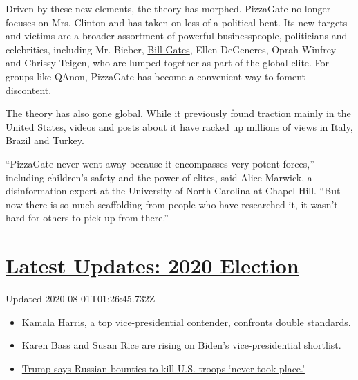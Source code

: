 Driven by these new elements, the theory has morphed. PizzaGate no
longer focuses on Mrs. Clinton and has taken on less of a political
bent. Its new targets and victims are a broader assortment of powerful
businesspeople, politicians and celebrities, including Mr. Bieber,
\href{https://www.nytimes3xbfgragh.onion/2020/04/17/technology/bill-gates-virus-conspiracy-theories.html}{Bill
Gates}, Ellen DeGeneres, Oprah Winfrey and Chrissy Teigen, who are
lumped together as part of the global elite. For groups like QAnon,
PizzaGate has become a convenient way to foment discontent.

The theory has also gone global. While it previously found traction
mainly in the United States, videos and posts about it have racked up
millions of views in Italy, Brazil and Turkey.

``PizzaGate never went away because it encompasses very potent forces,''
including children's safety and the power of elites, said Alice Marwick,
a disinformation expert at the University of North Carolina at Chapel
Hill. ``But now there is so much scaffolding from people who have
researched it, it wasn't hard for others to pick up from there.''

\hypertarget{latest-updates-2020-election}{%
\section{\texorpdfstring{\href{https://www.nytimes3xbfgragh.onion/2020/07/31/us/elections/biden-vs-trump.html?action=click\&pgtype=Article\&state=default\&region=MAIN_CONTENT_1\&context=storylines_live_updates}{Latest
Updates: 2020
Election}}{Latest Updates: 2020 Election}}\label{latest-updates-2020-election}}

Updated 2020-08-01T01:26:45.732Z

\begin{itemize}
\tightlist
\item
  \href{https://www.nytimes3xbfgragh.onion/2020/07/31/us/elections/biden-vs-trump.html?action=click\&pgtype=Article\&state=default\&region=MAIN_CONTENT_1\&context=storylines_live_updates\#link-29fdff45}{Kamala
  Harris, a top vice-presidential contender, confronts double
  standards.}
\item
  \href{https://www.nytimes3xbfgragh.onion/2020/07/31/us/elections/biden-vs-trump.html?action=click\&pgtype=Article\&state=default\&region=MAIN_CONTENT_1\&context=storylines_live_updates\#link-13ec3d9c}{Karen
  Bass and Susan Rice are rising on Biden's vice-presidential
  shortlist.}
\item
  \href{https://www.nytimes3xbfgragh.onion/2020/07/31/us/elections/biden-vs-trump.html?action=click\&pgtype=Article\&state=default\&region=MAIN_CONTENT_1\&context=storylines_live_updates\#link-49e9a016}{Trump
  says Russian bounties to kill U.S. troops `never took place.'}
\end{itemize}

